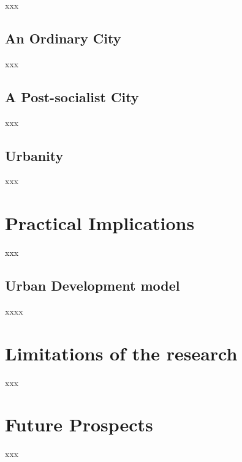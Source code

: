 \documentclass[11pt]{report}
\begin{document}
xxx

\subsection{An Ordinary City}

xxx

\subsection{A Post-socialist City}

xxx

\subsection{Urbanity}

xxx

\section{Practical Implications}

xxx

\subsection{Urban Development model}

xxxx

\section{Limitations of the research}

xxx

\section{Future Prospects}

xxx



\begin{small}

\end{small}



\newpage
\appendix
\noappendicestocpagenum
\addappheadtotoc
\end{document}
